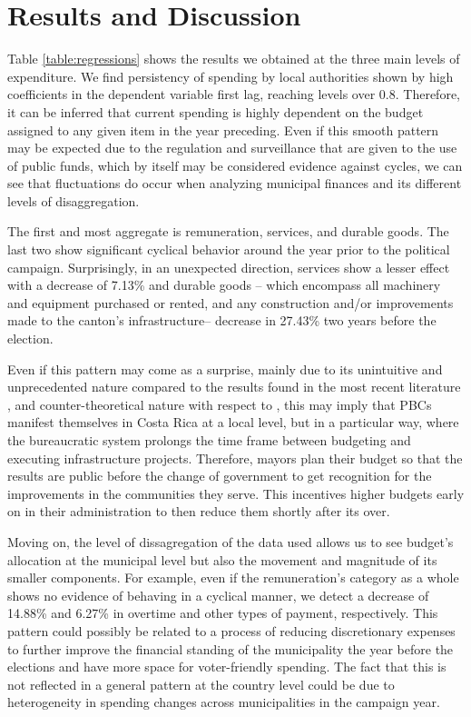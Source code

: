 \section{Results and Discussion}\label{sec:results}

Table \ref{table:regressions} shows the results we obtained at the three main levels of expenditure. We find persistency of spending by local authorities shown by high coefficients in the dependent variable first lag, reaching levels over 0.8. Therefore, it can be inferred that current spending is highly dependent on the budget assigned to any given item in the year preceding. Even if this smooth pattern may be expected due to the regulation and surveillance that are given to the use of public funds, which by itself may be considered evidence against cycles, we can see that fluctuations do occur when analyzing municipal finances and its different levels of disaggregation.
	
The first and most aggregate is remuneration, services, and durable goods. The last two show significant cyclical behavior around the year prior to the political campaign. Surprisingly, in an unexpected direction, services show a lesser effect with a decrease of 7.13\% and durable goods -- which encompass all machinery and equipment purchased or rented, and any construction and/or improvements made to the canton's infrastructure-- decrease in 27.43\% two years before the election. 

Even if this pattern may come as a surprise, mainly due to its unintuitive and unprecedented nature compared to the results found in the most recent literature \parencite{drazen2010, veiga2007}, and counter-theoretical nature with respect to \parencite{nordhaus1975, rogoff1988}, this may imply that PBCs manifest themselves in Costa Rica at a local level, but in a particular way, where the bureaucratic system prolongs the time frame between budgeting and executing infrastructure projects. Therefore, mayors plan their budget so that the results are public before the change of government to get recognition for the improvements in the communities they serve. This incentives higher budgets early on in their administration to then reduce them shortly after its over. 

\begin{landscape}
    
\end{landscape}

Moving on, the level of dissagregation of the data used allows us to see budget's allocation at the municipal level but also the movement and magnitude of its smaller components. For example, even if the remuneration's category as a whole shows no evidence of behaving in a cyclical manner, we detect a decrease of 14.88\% and 6.27\% in overtime and other types of payment, respectively. This pattern could possibly be related to a process of reducing discretionary expenses to further improve the financial standing of the municipality the year before the elections and have more space for voter-friendly spending. The fact that this is not reflected in a general pattern at the country level could be due to heterogeneity in spending changes across municipalities in the campaign year. 

